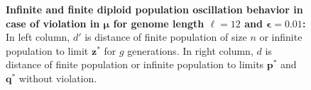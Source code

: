 \begin{figure}[h]
\begin{center}
\hspace{-3em}%
\vspace{-0.5em}  \hspace{-3em}%


\caption[\textbf{Infinite and finite diploid population oscillation behavior in case of violation in $\bm{\mu}$ for genome length $\ell = 12$ and $\bm{\epsilon} = 0.01$}]{\textbf{Infinite and finite diploid population oscillation behavior in case of violation in $\bm{\mu}$ for genome length $\ell = 12$ and $\bm{\epsilon} = 0.01$:} 
  In left column, $d'$ is distance of finite population of size $n$ or infinite population to limit $\bm{z}^\ast$ for $g$ generations. In right column, $d$ is distance of finite population or infinite population to limits $\bm{p}^\ast$ and $\bm{q}^\ast$ without violation.}
\label{oscillation_12d_vio_mu_0.01}
\end{center}
\end{figure}

